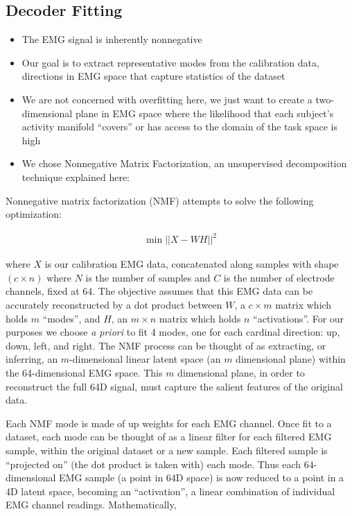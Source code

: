 \documentclass[../main.tex]{subfiles}
\begin{document}
\subsection{Decoder Fitting}\label{sec:decoder_fitting}


\begin{itemize}
  \item The EMG signal is inherently nonnegative
  \item Our goal is to extract representative modes from the calibration data, directions in EMG space that capture statistics of the dataset
  \item We are not concerned with overfitting here, we just want to create a two-dimensional plane in EMG space where the likelihood that each subject's activity manifold ``covers'' or has access to the domain of the task space is high
  \item We chose Nonnegative Matrix Factorization, an unsupervised decomposition technique explained here:
\end{itemize}

Nonnegative matrix factorization (NMF) attempts to solve the following optimization:

\begin{align}
  \min{||X - WH||^{2}}
\end{align}

where $X$ is our calibration EMG data, concatenated along samples with shape $(c\times{n})$ where $N$ is the number of samples and $C$ is the number of electrode channels, fixed at 64. The objective assumes that this EMG data can be accurately reconstructed by a dot product between $W$, a $c\times{m}$ matrix which holds $m$ ``modes'', and $H$, an $m\times{n}$ matrix which holds $n$ ``activations''. For our purposes we choose \textit{a priori} to fit 4 modes, one for each cardinal direction: up, down, left, and right. The NMF process can be thought of as extracting, or inferring, an $m$-dimensional linear latent space (an $m$ dimensional plane) within the 64-dimensional EMG space. This $m$ dimensional plane, in order to reconstruct the full 64D signal, must capture the salient features of the original data.

Each NMF mode is made of up weights for each EMG channel. Once fit to a dataset, each mode can be thought of as a linear filter for each filtered EMG sample, within the original dataset or a new sample. Each filtered sample is ``projected on'' (the dot product is taken with) each mode. Thus each 64-dimensional EMG sample (a point in 64D space) is now reduced to a point in a 4D latent space, becoming an ``activation'', a linear combination of individual EMG channel readings. Mathematically, 
\end{document}
